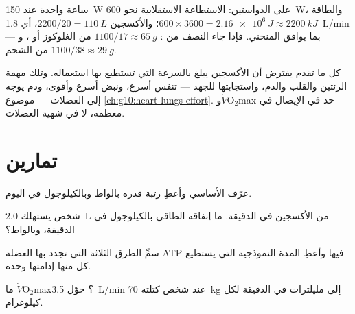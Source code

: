 \begin{example}\label{ex:g10:exercise-and-energy:hour}
ساعة واحدة عند \qty{150}{W} على الدواستين: الاستطاعة الاستقلابية نحو
\qty{600}{W}، والطاقة $600 \times 3600 = \qty{2.16e6}{J} \approx
\qty{2200}{kJ}$؛ والأكسجين $2200/20 = \qty{110}{L}$، أي
\qty{1.8}{L/min} --- بما يوافق المنحني. فإذا جاء النصف من
: $1100/17 \approx \qty{65}{g}$ من الغلوكوز أو
، و$1100/38 \approx \qty{29}{g}$ من الشحم.
\end{example}

\begin{remark}\label{rem:g10:exercise-and-energy:delivery}
كل ما تقدم يفترض أن الأكسجين يبلغ  بالسرعة التي تستطيع بها
استعماله. وتلك مهمة الرئتين والقلب والدم، واستجابتها للجهد --- تنفس
أسرع، ونبض أسرع وأقوى، ودم يوجه إلى العضلات --- موضوع
\cref{ch:g10:heart-lungs-effort}. و$\dot V\!\mathrm{O_2}$max حد في
الإيصال في معظمه، لا في شهية العضلات.
\end{remark}

\section{تمارين}

\begin{exercise}[$\star$]\label{exo:g10:exercise-and-energy:1}
عرّف  الأساسي وأعطِ رتبة قدره بالواط وبالكيلوجول في اليوم.
\end{exercise}

\begin{exercise}[$\star$]\label{exo:g10:exercise-and-energy:2}
شخص يستهلك \qty{2.0}{L} من الأكسجين في الدقيقة. ما إنفاقه الطاقي
بالكيلوجول في الدقيقة، وبالواط؟
\end{exercise}

\begin{exercise}[$\star$]\label{exo:g10:exercise-and-energy:3}
سمِّ الطرق الثلاثة التي تجدد بها العضلة ATP فيها وأعطِ المدة
النموذجية التي يستطيع كل منها إدامتها وحده.
\end{exercise}

\begin{exercise}[$\star$]\label{exo:g10:exercise-and-energy:4}
ما $\dot V\!\mathrm{O_2}$max؟ حوّل \qty{3.5}{L/min} عند شخص كتلته
\qty{70}{kg} إلى مليلترات في الدقيقة لكل كيلوغرام.
\end{exercise}

